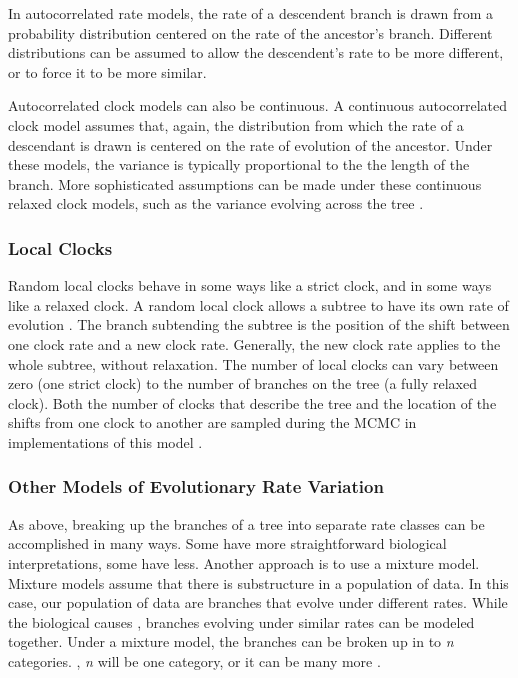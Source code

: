 In autocorrelated rate models, the rate of a descendent branch is drawn from a probability distribution \citep{Aris-Brosou2002} centered on the rate of the ancestor's branch.
Different distributions can be assumed to allow the descendent's rate to be more different, or to force it to be more similar.


Autocorrelated clock models can also be continuous.
A continuous autocorrelated clock model assumes that, again, the distribution from which the rate of a descendant is drawn is centered on the rate of evolution of the ancestor.
Under these models,  the variance is typically proportional to the the length of the branch.
More sophisticated assumptions can be made under these continuous  relaxed clock models, such as the variance  evolving across the tree \citep{Thorne1998, Kishino2001, Thorne2002, Aris-Brosou2002, Aris-Brosou2003}.

\subsubsection{Local Clocks}

Random local clocks behave in some ways like a strict clock, and in some ways like a relaxed clock.
A random local clock allows a subtree to have its own rate of evolution \citep{yoder2000}.
The branch subtending the subtree is the position of the shift between one clock rate and a new clock rate.
Generally, the new clock rate applies to the whole subtree, without relaxation.
The number of local clocks can vary between zero (one strict clock) to the number of branches on the tree (a fully relaxed clock).
Both the number of clocks that describe the tree and the location of the shifts from one clock to another are sampled during the MCMC in implementations of this model \citep{Drummond2010}.


\subsubsection{Other Models of Evolutionary Rate Variation}

As  above, breaking up the branches of a tree into separate rate classes can be accomplished in many ways.
Some have more straightforward biological interpretations, some have less.
Another approach is to use a mixture model.
Mixture models assume that there is substructure in a population of data.
In this case, our population of data are branches that evolve under different rates.
While the biological causes , branches evolving under similar rates can be modeled together.
Under a mixture model, the branches can be broken up in to \textit{n} categories.
, \textit{n} will be one category, or it can be many more .

